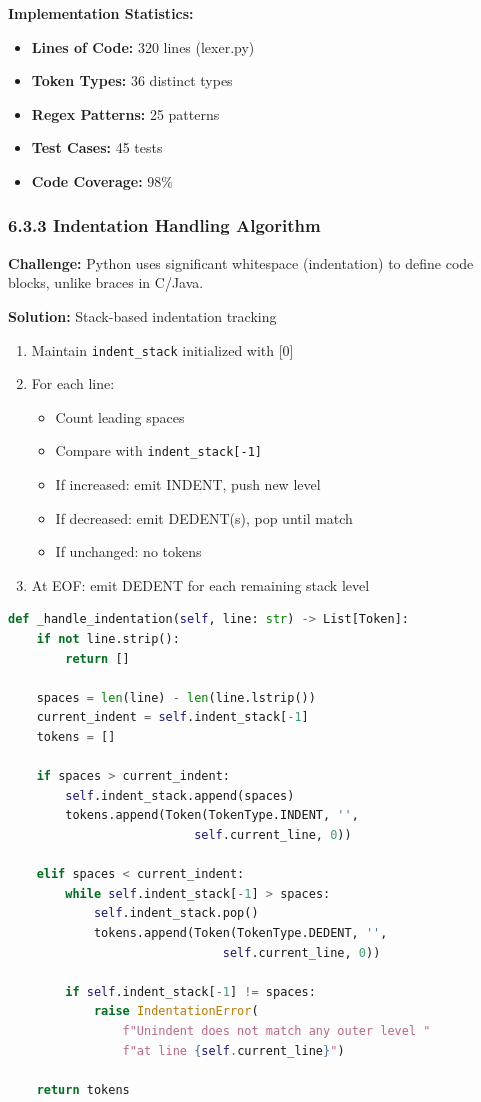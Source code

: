 \documentclass[a4paper,11pt]{article}
\begin{document}
\textbf{Implementation Statistics:}
\begin{itemize}
    \item \textbf{Lines of Code:} 320 lines (lexer.py)
    \item \textbf{Token Types:} 36 distinct types
    \item \textbf{Regex Patterns:} 25 patterns
    \item \textbf{Test Cases:} 45 tests
    \item \textbf{Code Coverage:} 98\%
\end{itemize}

\subsubsection{6.3.3 Indentation Handling Algorithm}

\textbf{Challenge:} Python uses significant whitespace (indentation) to define code blocks, unlike braces in C/Java.

\textbf{Solution:} Stack-based indentation tracking
\begin{enumerate}
    \item Maintain \texttt{indent\_stack} initialized with [0]
    \item For each line:
    \begin{itemize}
        \item Count leading spaces
        \item Compare with \texttt{indent\_stack[-1]}
        \item If increased: emit INDENT, push new level
        \item If decreased: emit DEDENT(s), pop until match
        \item If unchanged: no tokens
    \end{itemize}
    \item At EOF: emit DEDENT for each remaining stack level
\end{enumerate}

\begin{lstlisting}[language=Python, caption=Indentation Handler]
def _handle_indentation(self, line: str) -> List[Token]:
    if not line.strip():
        return []
    
    spaces = len(line) - len(line.lstrip())
    current_indent = self.indent_stack[-1]
    tokens = []
    
    if spaces > current_indent:
        self.indent_stack.append(spaces)
        tokens.append(Token(TokenType.INDENT, '', 
                          self.current_line, 0))
    
    elif spaces < current_indent:
        while self.indent_stack[-1] > spaces:
            self.indent_stack.pop()
            tokens.append(Token(TokenType.DEDENT, '', 
                              self.current_line, 0))
        
        if self.indent_stack[-1] != spaces:
            raise IndentationError(
                f"Unindent does not match any outer level "
                f"at line {self.current_line}")
    
    return tokens
\end{lstlisting}
\end{document}
